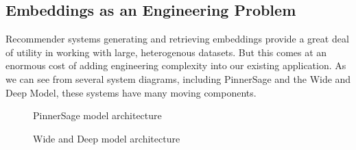 \documentclass[11pt, table]{diazessay} %
\begin{document}
\begin{sloppypar}
\subsection{Embeddings as an Engineering Problem}

Recommender systems generating and retrieving embeddings provide a great deal of utility in working with large, heterogenous datasets. But this comes at an enormous cost of adding engineering complexity into our existing application.  As we can see from several system diagrams, including PinnerSage and the Wide and Deep Model, these systems have many moving components. 

\begin{figure}[H]
\begin{minipage}[c]{0.5\linewidth}
\caption{PinnerSage model architecture\citep{pal2020pinnersage}}
\end{minipage}
\hfill
\begin{minipage}[c]{0.5\linewidth}
\caption{Wide and Deep model architecture\citep{cheng2016wide}}
\end{minipage}%
\end{figure}


\end{sloppypar}
\end{document}
